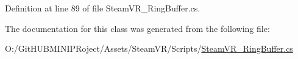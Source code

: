 Definition at line 89 of file Steam\+V\+R\+\_\+\+Ring\+Buffer.\+cs.



The documentation for this class was generated from the following file\+:\begin{DoxyCompactItemize}
\item 
O\+:/\+Git\+H\+U\+B\+M\+I\+N\+I\+P\+Roject/\+Assets/\+Steam\+V\+R/\+Scripts/\mbox{\hyperlink{_steam_v_r___ring_buffer_8cs}{Steam\+V\+R\+\_\+\+Ring\+Buffer.\+cs}}\end{DoxyCompactItemize}
